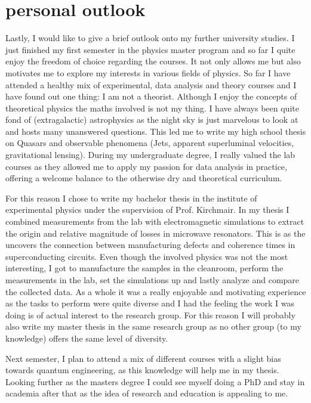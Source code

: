 \section{personal outlook}
Lastly, I would like to give a brief outlook onto my further university studies. I just finished my first semester in the physics master program and so far I quite enjoy the freedom of choice regarding the courses. It not only allows me but also motivates me to explore my interests in various fields of physics. So far I have attended a healthy mix of experimental, data analysis and theory courses and I have found out one thing: I am not a theorist. Although I enjoy the concepts of theoretical physics the maths involved is not my thing. I have always been quite fond of (extragalactic) astrophysics as the night sky is just marvelous to look at and hosts many unanswered questions. This led me to write my high school thesis on Quasars and observable phenomena (Jets, apparent superluminal velocities, gravitational lensing). During my undergraduate degree, I really valued the lab courses as they allowed me to apply my passion for data analysis in practice, offering a welcome balance to the otherwise dry and theoretical curriculum.

For this reason I chose to write my bachelor thesis in the institute of experimental physics under the supervision of Prof. Kirchmair. In my thesis I combined measurements from the lab with electromagnetic simulations to extract the origin and relative magnitude of losses in microwave resonators. This is as the uncovers the connection between manufacturing defects and coherence times in superconducting circuits. Even though the involved physics was not the most interesting, I got to manufacture the samples in the cleanroom, perform the measurements in the lab, set the simulations up and lastly analyze and compare the collected data. As a whole it was a really enjoyable and motivating experience as the tasks to perform were quite diverse and I had the feeling the work I was doing is of actual interest to the research group. For this reason I will probably also write my master thesis in the same research group as no other group (to my knowledge) offers the same level of diversity.

Next semester, I plan to attend a mix of different courses with a slight bias towards quantum engineering, as this knowledge will help me in my thesis. Looking further as the masters degree I could see myself doing a PhD and stay in academia after that as the idea of research and education is appealing to me. 